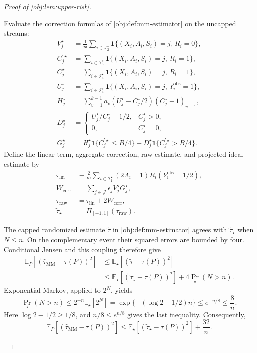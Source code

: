 \begin{proof}[Proof of \cref{obj:lem:upper-risk}]
\begin{enumerate}
Evaluate the correction formulas of \cref{obj:def:mm-estimator} on the uncapped streams:
\[
\begin{aligned}
V_j^\star&=\frac1m\sum_{i\in\mathcal I_2^\star}
\mathbf1\{(X_i,A_i,S_i)=j,\ R_i=0\},\\
C_j^{\prime\star}&=\sum_{i\in\mathcal I_3^\star}
\mathbf1\{(X_i,A_i,S_i)=j,\ R_i=1\},\\
C_j^\star&=\sum_{i\in\mathcal I_4^\star}
\mathbf1\{(X_i,A_i,S_i)=j,\ R_i=1\},\\
U_j^\star&=\sum_{i\in\mathcal I_4^\star}
\mathbf1\{(X_i,A_i,S_i)=j,\ Y_i^{\mathrm{obs}}=1\},\\
H_j^\star&=\sum_{v=1}^{k-1}
a_v(U_j^\star-C_j^\star/2)(C_j^\star-1)_{v-1},\\
D_j^\star&=
\begin{cases}
U_j^\star/C_j^\star-1/2,&C_j^\star>0,\\
0,&C_j^\star=0,
\end{cases}\\
G_j^\star&=
H_j^\star\mathbf1\{C_j^{\prime\star}\le B/4\}
+D_j^\star\mathbf1\{C_j^{\prime\star}>B/4\}.
\end{aligned}
\]
Define the linear term, aggregate correction, raw estimate, and projected ideal estimate by
\[
\begin{aligned}
\tau_{\mathrm{lin}}
&=\frac2m\sum_{i\in\mathcal I_1^\star}
(2A_i-1)R_i(Y_i^{\mathrm{obs}}-1/2),\\
W_{\mathrm{corr}}
&=\sum_{j\in\mathcal J}\epsilon_jV_j^\star G_j^\star,\\
\tau_{\mathrm{raw}}
&=\tau_{\mathrm{lin}}+2W_{\mathrm{corr}},\\
\widetilde\tau_\star&=\Pi_{[-1,1]}(\tau_{\mathrm{raw}}).
\end{aligned}
\]

The capped randomized estimate \(\widetilde\tau\) in
\cref{obj:def:mm-estimator} agrees with \(\widetilde\tau_\star\) when \(N\le n\).
On the complementary event their squared errors are bounded by four.
Conditional Jensen and this coupling therefore give
\[
\begin{aligned}
\mathbb E_P[(\widehat\tau_{\mathrm{MM}}-\tau(P))^2]
&\le\mathbb E_\star[(\widetilde\tau-\tau(P))^2]\\
&\le\mathbb E_\star[(\widetilde\tau_\star-\tau(P))^2]
+4\Pr_\star(N>n).
\end{aligned}
\]
Exponential Markov, applied to \(2^N\), yields
\[
\Pr_\star(N>n)
\le2^{-n}\mathbb E_\star[2^N]
=\exp\{-(\log2-1/2)n\}
\le e^{-n/8}
\le\frac8n.
\]
Here \(\log2-1/2\ge1/8\), and \(n/8\le e^{n/8}\) gives the last inequality. Consequently,
\[
\mathbb E_P[(\widehat\tau_{\mathrm{MM}}-\tau(P))^2]
\le\mathbb E_\star[(\widetilde\tau_\star-\tau(P))^2]
+\frac{32}{n}.
\]


\end{enumerate}
\end{proof}
